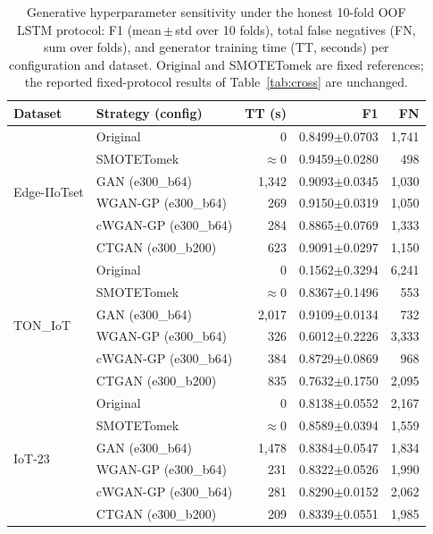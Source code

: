 ﻿\documentclass[journal]{IEEEtran}
\begin{document}
\begin{table}[!t]
\centering
\caption{Generative hyperparameter sensitivity under the honest 10-fold OOF LSTM protocol: F1 (mean\,$\pm$\,std over 10 folds), total false negatives (FN, sum over folds), and generator training time (TT, seconds) per configuration and dataset. Original and SMOTETomek are fixed references; the reported fixed-protocol results of Table~\ref{tab:cross} are unchanged.}
\label{tab:tune}
\footnotesize
\setlength{\tabcolsep}{5pt}
\begin{tabular}{@{}llrrr@{}}
\toprule
Dataset & Strategy (config) & TT (s) & F1 & FN \\
\midrule
\multirow{6}{*}{Edge-IIoTset}
 & Original             & 0      & 0.8499$\pm$0.0703 & 1{,}741 \\
 & SMOTETomek           & $\approx$0 & 0.9459$\pm$0.0280 & 498 \\
 & GAN (e300\_b64)      & 1{,}342 & 0.9093$\pm$0.0345 & 1{,}030 \\
 & WGAN-GP (e300\_b64)  & 269    & 0.9150$\pm$0.0319 & 1{,}050 \\
 & cWGAN-GP (e300\_b64) & 284    & 0.8865$\pm$0.0769 & 1{,}333 \\
 & CTGAN (e300\_b200)   & 623    & 0.9091$\pm$0.0297 & 1{,}150 \\
\multirow{6}{*}{TON\_IoT}
 & Original             & 0      & 0.1562$\pm$0.3294 & 6{,}241 \\
 & SMOTETomek           & $\approx$0 & 0.8367$\pm$0.1496 & 553 \\
 & GAN (e300\_b64)      & 2{,}017 & 0.9109$\pm$0.0134 & 732 \\
 & WGAN-GP (e300\_b64)  & 326    & 0.6012$\pm$0.2226 & 3{,}333 \\
 & cWGAN-GP (e300\_b64) & 384    & 0.8729$\pm$0.0869 & 968 \\
 & CTGAN (e300\_b200)   & 835    & 0.7632$\pm$0.1750 & 2{,}095 \\
\multirow{6}{*}{IoT-23}
 & Original             & 0      & 0.8138$\pm$0.0552 & 2{,}167 \\
 & SMOTETomek           & $\approx$0 & 0.8589$\pm$0.0394 & 1{,}559 \\
 & GAN (e300\_b64)      & 1{,}478 & 0.8384$\pm$0.0547 & 1{,}834 \\
 & WGAN-GP (e300\_b64)  & 231    & 0.8322$\pm$0.0526 & 1{,}990 \\
 & cWGAN-GP (e300\_b64) & 281    & 0.8290$\pm$0.0152 & 2{,}062 \\
 & CTGAN (e300\_b200)   & 209    & 0.8339$\pm$0.0551 & 1{,}985 \\
\bottomrule
\end{tabular}
\end{table}
\end{document}
